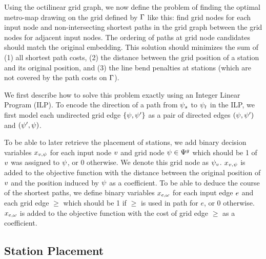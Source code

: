 \documentclass[sigconf]{acmart}
\begin{document}
Using the octilinear grid graph, we now define the problem of finding the optimal metro-map drawing on the grid defined by $\Gamma$ like this: find grid nodes for each input node and non-intersecting shortest paths in the grid graph between the grid nodes for adjacent input nodes.
The ordering of paths at grid node candidates should match the original embedding.
This solution should minimizes the sum of (1) all shortest path costs, (2) the distance between the grid position of a station and its original position, and (3) the line bend penalties at stations (which are not covered by the path costs on $\Gamma$).

We first describe how to solve this problem exactly using an Integer Linear Program (ILP).
To encode the direction of a path from $\psi_s$ to $\psi_t$ in the ILP, we first model each undirected grid edge $\{\psi, \psi'\}$ as a pair of directed edges $(\psi, \psi')$ and $(\psi', \psi)$.

To be able to later retrieve the placement of stations, we add binary decision variables $x_{v,\psi}$ for each input node $v$ and grid node $\psi \in \Psi^g$ which should be 1 of $v$ was assigned to $\psi$, or 0 otherwise.
We denote this grid node as $\psi_v$.
$x_{v,\psi}$ is added to the objective function with the distance between the original position of $v$ and the position induced by $\psi$ as a coefficient.
To be able to deduce the course of the shortest paths, we define binary variables $x_{e,\omega}$ for each input edge $e$ and each grid edge $\ge$ which should be 1 if $\ge$ is used in path for $e$, or 0 otherwise.
$x_{e,\omega}$ is added to the objective function with the cost of grid edge $\ge$ as a coefficient.

\subsection{Station Placement}
\end{document}
